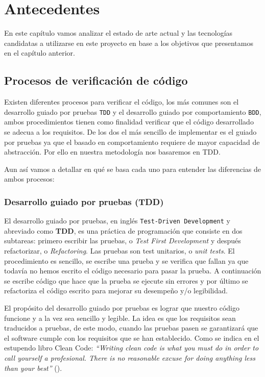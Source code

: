 \chapter{Antecedentes}

En este capítulo vamos analizar el estado de arte actual y las tecnologías candidatas a utilizarse en este proyecto en base a los objetivos que presentamos en el capítulo anterior.


\section {Procesos de verificación de código}

Existen diferentes procesos para verificar el código, los más comunes son el desarrollo guiado por pruebas \texttt{TDD} y el desarrollo guiado por comportamiento \texttt{BDD}, ambos procedimientos tienen como finalidad verificar que el código desarrollado se adecua a los requisitos. De los dos el más sencillo de implementar es el guiado por pruebas ya que el basado en comportamiento requiere de mayor capacidad de abstracción. Por ello en nuestra metodología nos basaremos en TDD.

\bigskip
Aun así vamos a detallar en qué se basa cada uno para entender las diferencias de ambos procesos:

\subsection {Desarrollo guiado por pruebas (TDD)}

El desarrollo guiado por pruebas, en inglés \texttt{Test-Driven Development} y abreviado como \textbf{TDD}, es una práctica de programación que consiste en dos subtareas: primero escribir las pruebas, o \textit{Test First Development} y después refactorizar, o \textit{Refactoring}. Las pruebas son test unitarios, o \textit{unit tests}. El procedimiento es sencillo, se escribe una prueba y se verifica que fallan ya que todavía no hemos escrito el código necesario para pasar la prueba. A continuación se escribe código que hace que la prueba se ejecute sin errores y por último se refactoriza el código escrito para mejorar su desempeño y/o legibilidad.

\bigskip
El propósito del desarrollo guiado por pruebas es lograr que nuestro código funcione y a la vez sea sencillo y legible. La idea es que los requisitos sean traducidos a pruebas, de este modo, cuando las pruebas pasen se garantizará que el software cumple con los requisitos que se han establecido. Como se indica en el estupendo libro Clean Code: \textit{``Writing clean code is what you must do in order to call yourself a profesional. There is no reasonable excuse for doing anything less than your best''} (\cite{martin_clean_2009}).

